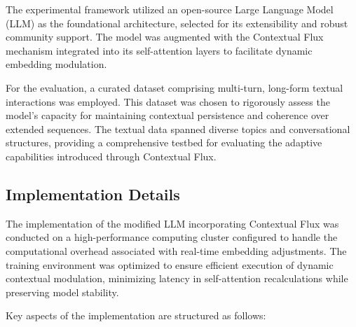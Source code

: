 \documentclass{article}
\begin{document}
The experimental framework utilized an open-source Large Language Model (LLM) as the foundational architecture, selected for its extensibility and robust community support. The model was augmented with the Contextual Flux mechanism integrated into its self-attention layers to facilitate dynamic embedding modulation.

For the evaluation, a curated dataset comprising multi-turn, long-form textual interactions was employed. This dataset was chosen to rigorously assess the model's capacity for maintaining contextual persistence and coherence over extended sequences. The textual data spanned diverse topics and conversational structures, providing a comprehensive testbed for evaluating the adaptive capabilities introduced through Contextual Flux.

\subsection{Implementation Details}

The implementation of the modified LLM incorporating Contextual Flux was conducted on a high-performance computing cluster configured to handle the computational overhead associated with real-time embedding adjustments. The training environment was optimized to ensure efficient execution of dynamic contextual modulation, minimizing latency in self-attention recalculations while preserving model stability.

Key aspects of the implementation are structured as follows:
\end{document}
